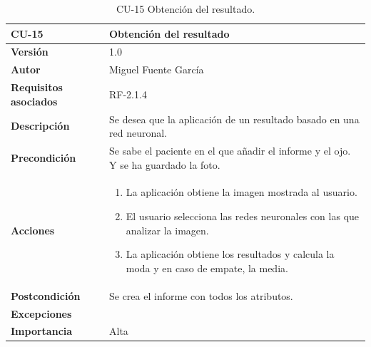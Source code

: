 \begin{table}[p]
	\centering
	\begin{tabularx}{\linewidth}{ p{} p{} }
		\toprule
		\textbf{CU-15}    & \textbf{Obtención del resultado}\\
		\toprule
		\textbf{Versión}              & 1.0    \\
		\textbf{Autor}                & Miguel Fuente García \\
		\textbf{Requisitos asociados} & RF-2.1.4 \\
		\textbf{Descripción}          & Se desea que la aplicación de un resultado basado en una red neuronal. \\
		\textbf{Precondición}         & Se sabe el paciente en el que añadir el informe y el ojo. Y se ha guardado la foto. \\
		\textbf{Acciones}             &
		\begin{enumerate}
			\def\labelenumi{\arabic{enumi}.}
			\tightlist
			\item La aplicación obtiene la imagen mostrada al usuario.
            \item El usuario selecciona las redes neuronales con las que analizar la imagen.
            \item La aplicación obtiene los resultados y calcula la moda y en caso de empate, la media.
		\end{enumerate}\\
		\textbf{Postcondición}        & Se crea el informe con todos los atributos. \\
		\textbf{Excepciones}          &  \\
		\textbf{Importancia}          & Alta  \\
		\bottomrule
	\end{tabularx}
	\caption{CU-15 Obtención del resultado.}
\end{table}

